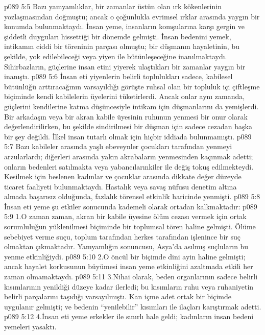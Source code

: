 \vs p089 5:5 Bazı yamyamlıklar, bir zamanlar üstün olan ırk kökenlerinin yozlaşmasından doğmuştu; ancak o çoğunlukla evrimsel ırklar arasında yaygın bir konumda bulunmaktaydı. İnsan yeme, insanların komşularına karşı gergin ve şiddetli duyguları hissettiği bir dönemde gelmişti. İnsan bedenini yemek, intikamın ciddi bir töreninin parçası olmuştu; bir düşmanın hayaletinin, bu şekilde, yok edilebileceği veya yiyen ile bütünleşeceğine inanılmaktaydı. Sihirbazların, güçlerine insan etini yiyerek ulaştıkları bir zamanlar yaygın bir inanıştı.
\vs p089 5:6 İnsan eti yiyenlerin belirli toplulukları sadece, kabilesel bütünlüğü arttıracağının varsayıldığı görüşte ruhsal olan bir topluluk içi çiftleşme biçiminde kendi kabilelerin üyelerini tüketirlerdi. Ancak onlar aynı zamanda, güçlerini kendilerine katma düşüncesiyle intikam için düşmanlarını da yemişlerdi. Bir arkadaşın veya bir akran kabile üyesinin ruhunun yenmesi bir onur olarak değerlendirilirken, bu şekilde sindirilmesi bir düşman için sadece cezadan başka bir şey değildi. İlkel insan tutarlı olmak için hiçbir iddiada bulunmamıştı.
\vs p089 5:7 Bazı kabileler arasında yaşlı ebeveynler çocukları tarafından yenmeyi arzularlardı; diğerleri arasında yakın akrabaların yenmesinden kaçınmak adetti; onların bedenleri satılmakta veya yabancılarınkiler ile değiş tokuş edilmekteydi. Kesilmek için beslenen kadınlar ve çocuklar arasında dikkate değer düzeyde ticaret faaliyeti bulunmaktaydı. Hastalık veya savaş nüfusu denetim altına almada başarısız olduğunda, fazlalık törensel etkinlik haricinde yenmişti.
\vs p089 5:8 İnsan eti yeme şu etkiler sonucunda kademeli olarak ortadan kalkmaktadır:
\vs p089 5:9 1.\bibnobreakspace O zaman zaman, akran bir kabile üyesine ölüm cezası vermek için ortak sorumluluğun yüklenilmesi biçiminde bir toplumsal tören haline gelmişti. Ölüme sebebiyet verme suçu, toplum tarafından herkes tarafından işlenince bir suç olmaktan çıkmaktadır. Yamyamlığın sonuncusu, Asya’da asılmış suçluların bu yenme etkinliğiydi.
\vs p089 5:10 2.\bibnobreakspace O öncül bir biçimde dini ayin haline gelmişti; ancak hayalet korkusunun büyümesi insan yeme etkinliğini azaltmada etkili her zaman olmamaktaydı.
\vs p089 5:11 3.\bibnobreakspace Nihai olarak, beden organlarının sadece belirli kısımlarının yenildiği düzeye kadar ilerledi; bu kısımların ruhu veya ruhaniyetin belirli parçalarını taşıdığı varsayılmıştı. Kan içme adet ortak bir biçimde uygulanır gelmişti; ve bedenin “yenilebilir” kısımları ile ilaçları karıştırmak adetti.
\vs p089 5:12 4.\bibnobreakspace İnsan eti yeme erkekler ile sınırlı hale geldi; kadınların insan bedeni yemeleri yasaktı.
